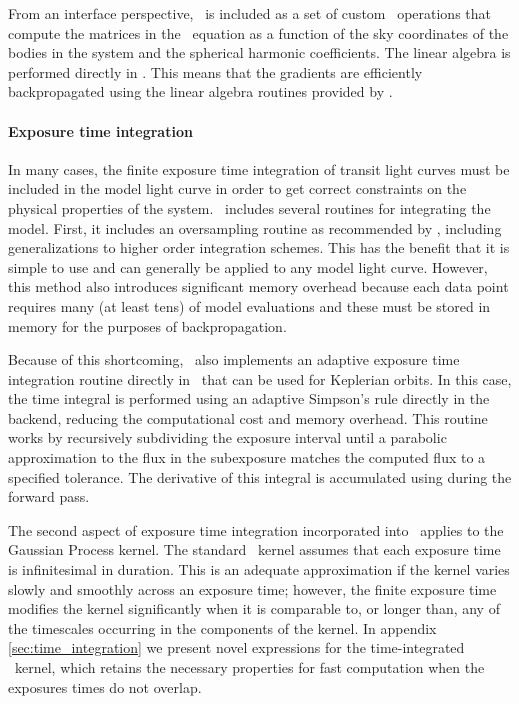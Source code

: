 \documentclass[modern]{aastex62}
\begin{document}
From an interface perspective, \starry\ is included as a set of custom \theano\ operations that compute the matrices in the \starry\ equation as a function of the sky coordinates of the bodies in the system and the spherical harmonic coefficients.
The linear algebra is performed directly in \theano.
This means that the gradients are efficiently backpropagated using the linear algebra routines provided by \theano.

\paragraph{Exposure time integration}
In many cases, the finite exposure time integration of transit light curves must be included in the model light curve in order to get correct constraints on the physical properties of the system.
\exoplanet\ includes several routines for integrating the model.
First, it includes an oversampling routine as recommended by , including generalizations to higher order integration schemes.
This has the benefit that it is simple to use and can generally be applied to any model light curve.
However, this method also introduces significant memory overhead because each data point requires many (at least tens) of model evaluations and these must be stored in memory for the purposes of backpropagation.

Because of this shortcoming, \exoplanet\ also implements an adaptive exposure time integration routine directly in \cpp\ that can be used for Keplerian orbits.
In this case, the time integral is performed using an adaptive Simpson's rule  directly in the backend, reducing the computational cost and memory overhead.
This routine works by recursively subdividing the exposure interval until a parabolic approximation to the flux in the subexposure matches the computed flux to a specified tolerance.
The derivative of this integral is accumulated using during the forward pass.

The second aspect of exposure time integration incorporated into \exoplanet\
applies to the Gaussian Process kernel.  The standard \celerite\ kernel assumes that each
exposure time is infinitesimal in duration.  This is an adequate approximation
if the kernel varies slowly and smoothly across an exposure time;
however, the finite exposure time modifies the kernel significantly when it is
comparable to, or longer than, any of the timescales occurring in the components of
the kernel.  In appendix \ref{sec:time_integration} we present novel expressions for
the time-integrated \celerite\ kernel, which retains the necessary properties
for fast computation when the exposures times do not overlap.
\end{document}
